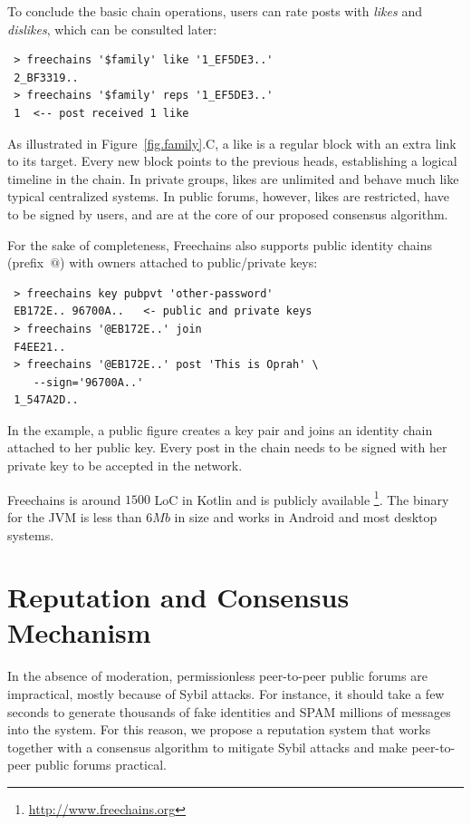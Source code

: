 \documentclass[10pt,journal,compsoc]{IEEEtran}
\newcommand{\FC}       {Freechains\xspace}
\begin{document}
To conclude the basic chain operations, users can rate posts with \emph{likes}
and \emph{dislikes}, which can be consulted later:

{\footnotesize
\begin{verbatim}
 > freechains '$family' like '1_EF5DE3..'
 2_BF3319..
 > freechains '$family' reps '1_EF5DE3..'
 1  <-- post received 1 like
\end{verbatim}
}

As illustrated in Figure~\ref{fig.family}.C, a like is a regular block with an
extra link to its target.
Every new block points to the previous heads, establishing a logical timeline
in the chain.
In private groups, likes are unlimited and behave much like typical centralized
systems.
In public forums, however, likes are restricted, have to be signed by users,
and are at the core of our proposed consensus algorithm.

For the sake of completeness, \FC also supports public identity chains
(prefix~$@$) with owners attached to public/private keys:

{\footnotesize
\begin{verbatim}
 > freechains key pubpvt 'other-password'
 EB172E.. 96700A..   <- public and private keys
 > freechains '@EB172E..' join
 F4EE21..
 > freechains '@EB172E..' post 'This is Oprah' \
    --sign='96700A..'
 1_547A2D..
\end{verbatim}
}

In the example, a public figure creates a key pair and joins an identity chain
attached to her public key.
Every post in the chain needs to be signed with her private key to be accepted
in the network.

\FC is around $1500$ LoC in Kotlin and is publicly available%
\footnote{\url{http://www.freechains.org}}.
The binary for the JVM is less than $6Mb$ in size and works in Android and most
desktop systems.

\section{Reputation and Consensus Mechanism}
\label{sec.consensus}

In the absence of moderation, permissionless peer-to-peer public forums are
impractical, mostly because of Sybil attacks.
For instance, it should take a few seconds to generate thousands of fake
identities and SPAM millions of messages into the system.
For this reason, we propose a reputation system that works together with a
consensus algorithm to mitigate Sybil attacks and make peer-to-peer public
forums practical.
\end{document}

